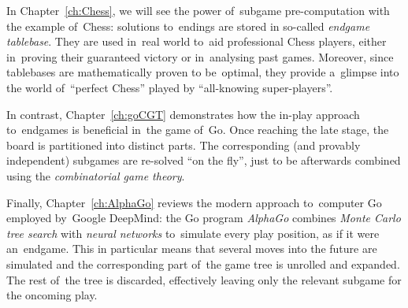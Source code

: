 In Chapter~\ref{ch:Chess}, we will see the power of~subgame pre-computation with the example of~Chess:
solutions to~endings are stored in so-called \emph{endgame tablebase}.
They are used in~real world to~aid professional Chess players, either in~proving their guaranteed victory or in~analysing past games.
Moreover, since tablebases are mathematically proven to be~optimal, they provide a~glimpse into the world of~``perfect Chess'' played by ``all-knowing super-players''.

In contrast, Chapter~\ref{ch:goCGT} demonstrates how the in-play approach to~endgames is beneficial in~the game of~Go.
Once reaching the late stage, the board is partitioned into distinct parts.
The corresponding (and provably independent) subgames are re-solved ``on the fly'', just to be afterwards combined using the \emph{combinatorial game theory}.

Finally, Chapter~\ref{ch:AlphaGo} reviews the modern approach to~computer Go employed by~Google DeepMind:
the Go program \emph{AlphaGo} combines \emph{Monte Carlo tree search} with \emph{neural networks} to~simulate every play position, as if it were an~endgame.
This in particular means that several moves into the future are simulated and the corresponding part of~the game tree is unrolled and expanded.
The rest of~the tree is discarded, effectively leaving only the relevant subgame for the oncoming play.
